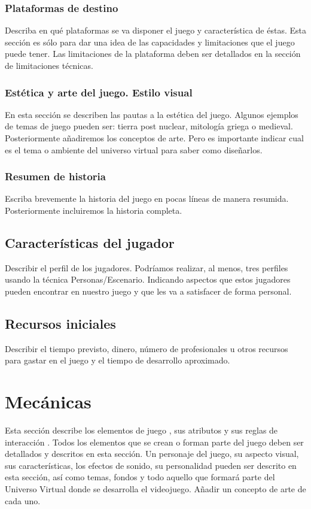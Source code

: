 \subsubsection{Plataformas de destino}
Describa en qué plataformas se va disponer el juego y característica de éstas. Esta sección es sólo para dar una idea de las capacidades y limitaciones que el juego puede tener. Las limitaciones de la plataforma deben ser detallados en la sección de limitaciones técnicas.


\subsubsection{Estética y arte del juego. Estilo visual}
En esta sección se describen las pautas a la estética del juego. Algunos ejemplos de temas de juego pueden ser: tierra post nuclear, mitología griega o medieval. Posteriormente añadiremos los conceptos de arte. Pero es importante indicar cual es el tema o ambiente del universo virtual para saber como diseñarlos.

\subsubsection{Resumen de historia}
Escriba brevemente la historia del juego en pocas líneas de manera resumida. Posteriormente incluiremos la historia completa.

\subsection{Características del jugador}
Describir el perfil de los jugadores. Podríamos realizar, al menos, tres perfiles usando la técnica Personas/Escenario. Indicando aspectos que estos jugadores pueden encontrar en nuestro juego y que les va a satisfacer de forma personal.

\subsection{Recursos iniciales}
Describir el tiempo previsto, dinero, número de profesionales u otros recursos para gastar en el juego y el tiempo de desarrollo aproximado.


\section{Mecánicas}
Esta sección describe los elementos de juego , sus atributos y sus reglas de interacción . Todos los elementos que se crean o forman parte del juego deben ser detallados y descritos en esta sección. Un personaje del juego, su aspecto visual, sus características, los efectos de sonido, su personalidad pueden ser descrito en esta sección, así como temas, fondos y todo aquello que formará parte del Universo Virtual donde se desarrolla el videojuego. Añadir un concepto de arte de cada uno.

